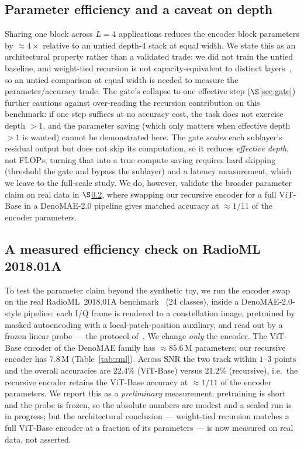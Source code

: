 \documentclass[conference]{IEEEtran}
\begin{document}
\subsection{Parameter efficiency and a caveat on depth}
Sharing one block across $L{=}4$ applications reduces the encoder block parameters
by $\approx 4\times$ relative to an untied depth-4 stack at equal width. We state
this as an architectural property rather than a validated trade: we did not train
the untied baseline, and weight-tied recursion is not capacity-equivalent to
distinct layers~\cite{ut,albert}, so an untied comparison at equal width is needed
to measure the parameter/accuracy trade. The gate's collapse to one effective step
($\S$\ref{sec:gate}) further cautions against over-reading the recursion
contribution on this benchmark: if one step suffices at no accuracy cost, the task
does not exercise depth $>1$, and the parameter saving (which only matters when
effective depth $>1$ is wanted) cannot be demonstrated here. The gate \emph{scales}
each sublayer's residual output but does not skip its computation, so it reduces
\emph{effective depth}, not FLOPs; turning that into a true compute saving requires
hard skipping (threshold the gate and bypass the sublayer) and a latency
measurement, which we leave to the full-scale study. We do, however, validate the
broader parameter claim on real data in $\S$\ref{sec:radioml}, where swapping our
recursive encoder for a full ViT-Base in a DenoMAE-2.0 pipeline gives matched
accuracy at $\approx 1/11$ of the encoder parameters.

\subsection{A measured efficiency check on RadioML 2018.01A}
\label{sec:radioml}
To test the parameter claim beyond the synthetic toy, we run the encoder swap on the
real RadioML~2018.01A benchmark~\cite{oshea2018} (24 classes), inside a
DenoMAE-2.0-style pipeline: each I/Q frame is rendered to a constellation image,
pretrained by masked autoencoding with a local-patch-position auxiliary, and read
out by a frozen linear probe --- the protocol of~\cite{denomae2}. We change
\emph{only} the encoder. The ViT-Base encoder of the DenoMAE family has
$\approx 85.6$\,M parameters; our recursive encoder has $7.8$\,M (Table~\ref{tab:rml}).
Across SNR the two track within $1$--$3$ points and the overall accuracies are
$22.4\%$ (ViT-Base) versus $21.2\%$ (recursive), i.e.\ the recursive encoder retains
the ViT-Base accuracy at $\approx 1/11$ of the encoder parameters. We report this as
a \emph{preliminary} measurement: pretraining is short and the probe is frozen, so
the absolute numbers are modest and a scaled run is in progress; but the
architectural conclusion --- weight-tied recursion matches a full ViT-Base encoder at
a fraction of its parameters --- is now measured on real data, not asserted.
\end{document}
